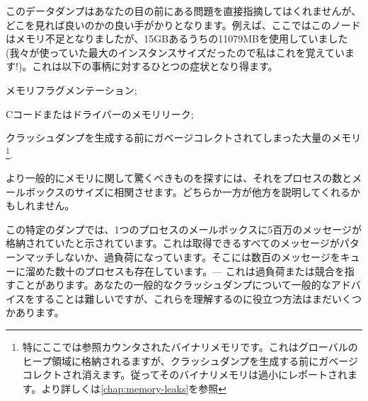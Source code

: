 このデータダンプはあなたの目の前にある問題を直接指摘してはくれませんが、どこを見れば良いのかの良い手がかりとなります。例えば、ここではこのノードはメモリ不足となりましたが、15GBあるうちの11079MBを使用していました(我々が使っていた最大のインスタンスサイズだったので私はこれを覚えています!)。これは以下の事柄に対するひとつの症状となり得ます。

\begin{itemize*}
	\item メモリフラグメンテーション;
	\item Cコードまたはドライバーのメモリリーク;
	\item クラッシュダンプを生成する前にガベージコレクトされてしまった大量のメモリ\footnote{特にここでは参照カウンタされたバイナリメモリです。これはグローバルのヒープ領域に格納されるますが、クラッシュダンプを生成する前にガベージコレクトされ消えます。従ってそのバイナリメモリは過小にレポートされます。より詳しくは\ref{chap:memory-leaks}を参照}.
\end{itemize*}

より一般的にメモリに関して驚くべきものを探すには、それをプロセスの数とメールボックスのサイズに相関させます。どちらか一方が他方を説明してくれるかもしれません。

この特定のダンプでは、1つのプロセスのメールボックスに5百万のメッセージが格納されていたと示されています。これは取得できるすべてのメッセージがパターンマッチしないか、過負荷になっています。そこには数百のメッセージをキューに溜めた数十のプロセスも存在しています。--- これは過負荷または競合を指すことがあります。あなたの一般的なクラッシュダンプについて一般的なアドバイスをすることは難しいですが、これらを理解するのに役立つ方法はまだいくつかあります。

